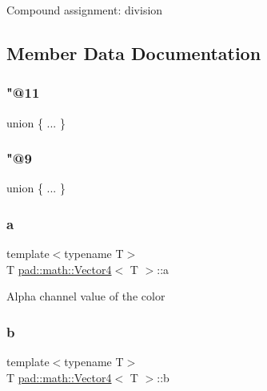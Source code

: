 Compound assignment\+: division 

\subsection{Member Data Documentation}
\mbox{\label{structpad_1_1math_1_1_vector4_ab20659ceb49f902c572024d22deea016}} 
\subsubsection{\texorpdfstring{"@11}{@11}}
{\footnotesize\ttfamily union \{ ... \} }

\mbox{\label{structpad_1_1math_1_1_vector4_a17be2a981a26a27c41382122c9c4c948}} 
\subsubsection{\texorpdfstring{"@9}{@9}}
{\footnotesize\ttfamily union \{ ... \} }

\mbox{\label{structpad_1_1math_1_1_vector4_afb5d50917f750bbe417871b7f290b10c}} 
\subsubsection{\texorpdfstring{a}{a}}
{\footnotesize\ttfamily template$<$typename T$>$ \\
T \mbox{\hyperlink{structpad_1_1math_1_1_vector4}{pad\+::math\+::\+Vector4}}$<$ T $>$\+::a}

Alpha channel value of the color \mbox{\label{structpad_1_1math_1_1_vector4_a00d2630fa1befcfa4c343e2f4187ec71}} 
\subsubsection{\texorpdfstring{b}{b}}
{\footnotesize\ttfamily template$<$typename T$>$ \\
T \mbox{\hyperlink{structpad_1_1math_1_1_vector4}{pad\+::math\+::\+Vector4}}$<$ T $>$\+::b}

